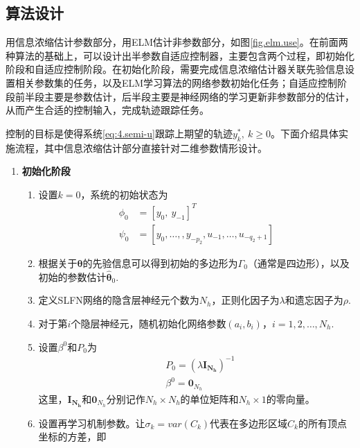 \subsection{算法设计}\label{sect:4.3.1}
用信息浓缩估计参数部分，用ELM估计非参数部分，如图\ref{fig.elm.use}。在前面两种算法的基础上，可以设计出半参数自适应控制器，主要包含两个过程，即初始化阶段和自适应控制阶段。在初始化阶段，需要完成信息浓缩估计器关联先验信息设置相关参数集的任务，以及ELM学习算法的网络参数初始化任务；自适应控制阶段前半段主要是参数估计，后半段主要是神经网络的学习更新非参数部分的估计，从而产生合适的控制输入，完成轨迹跟踪任务。

控制的目标是使得系统\ref{eq:4.semi-u}跟踪上期望的轨迹$y^{*}_{k},\ k\geq0$。下面介绍具体实施流程，其中信息浓缩估计部分直接针对二维参数情形设计。

\begin{enumerate}%
\item \textbf{初始化阶段}
\begin{enumerate}%
\item 设置$k=0$，系统的初始状态为
\begin{equation*}
\begin{split}%
\phi_{0}&=[y_{0},\ y_{-1}]^{T}\\
\psi_{0}&=[y_{0},\dots,,y_{-p_{2}},u_{-1},\dots,u_{-q_{2}+1}]
\end{split}
\end{equation*}
\item 根据关于$\bm{\theta}$的先验信息可以得到初始的多边形为$\Gamma_{0}$（通常是四边形），以及初始的参数估计$\hat{\bm{\theta}}_{0}$.
\item 定义SLFN网络的隐含层神经元个数为$N_{h}$，正则化因子为$\lambda$和遗忘因子为$\rho$.
\item 对于第$i$个隐层神经元，随机初始化网络参数$(a_{i},b_{i})$，$i=1,2,\ldots,N_{h}$.
\item 设置$\beta^{0}$和$P_{0}$为
\begin{equation}\label{eq.elm0}
\begin{split}%
& P_{0} = (\lambda \bm{I_{N_{h}}})^{-1} \\
& \beta^{0} = \bm{0}_{N_{h}}
\end{split}
\end{equation}
这里，$\bm{I_{N_{h}}}$和$\bm{0}_{N_{h}}$分别记作$N_{h}\times N_{h}$的单位矩阵和$N_{h}\times1$的零向量。
\item 设置再学习机制参数。让$\sigma_{k}=var(C_{k})$代表在多边形区域$C_{k}$的所有顶点坐标的方差，即
\begin{equation}
\begin{split}%

\end{split}
\end{equation}
\end{enumerate}
\end{enumerate}
